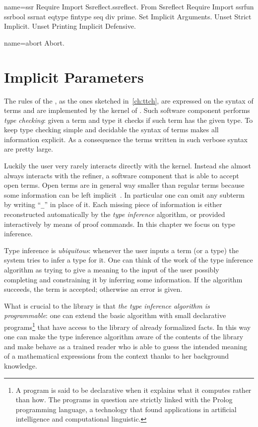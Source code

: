 \begin{coqdef}{name=ssr}
Require Import Ssreflect.ssreflect.
From Ssreflect Require Import ssrfun ssrbool ssrnat eqtype fintype seq div prime.
Set Implicit Arguments.
Unset Strict Implicit.
Unset Printing Implicit Defensive.
\end{coqdef}
\begin{coqdef}{name=abort}
Abort.
\end{coqdef}

\chapter{Implicit Parameters}{}

The rules of the \mcbCIC{}, as the ones sketched in~\ref{ch:ttch},
are expressed on the syntax of terms and
are implemented by the kernel of \Coq{}.  Such software component
performs \emph{type checking}: given a term and type it checks if such
term has the given type.  To keep type checking simple and decidable
the syntax of terms makes all information explicit. As a consequence
the terms written in such verbose syntax are pretty large.

Luckily the user very rarely interacts directly with the kernel.
Instead she almost always interacts with the refiner, a software
component that is able to accept open terms.  Open terms are in
general way smaller than regular terms because some information can be
left implicit~\cite{Pollack92implicitsyntax}.
In particular one can omit any subterm by writing
``\lstinline/_/'' in place of it.
Each missing piece of information is either reconstructed
automatically by the \emph{type inference} algorithm, or provided
interactively by means of proof commands.  In this chapter we
focus on type inference.

Type inference is \emph{ubiquitous}: whenever the user inputs a term
(or a type) the system tries to infer a type for it.
One can think of the work of the type inference
algorithm as trying to give a meaning to the input of the
user possibly completing and constraining it by inferring some
information.  If the algorithm succeeds, the term is accepted;
otherwise an error is given.

What is crucial to the \mcbMC{} library is that
\emph{the type inference algorithm is programmable}:
one can extend the
basic algorithm with small declarative programs\footnote{A program is
said to be declarative when it explains what it computes rather than
how. The programs in question are strictly linked with the Prolog
programming language, a technology that found applications in artificial
intelligence and computational linguistic.}
that have access to
the library of already formalized facts.  In this way one can make the
type inference algorithm aware of the contents of the library and
make \Coq{} behave as a trained reader who is able to guess the
intended meaning of a mathematical expressions from the context
thanks to her background knowledge.

